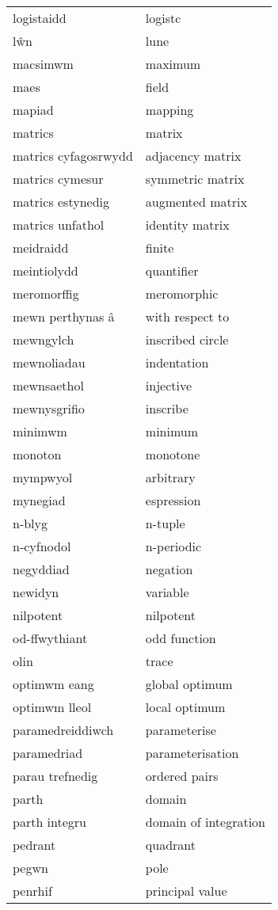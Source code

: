 \begin{supertabular}{p{0.22\textwidth}p{0.22\textwidth}}
logistaidd & logistc \\
lŵn & lune \\
macsimwm & maximum \\
maes & field \\
mapiad & mapping \\
matrics & matrix \\
matrics cyfagosrwydd & adjacency matrix \\
matrics cymesur & symmetric matrix \\
matrics estynedig & augmented matrix \\
matrics unfathol & identity matrix \\
meidraidd & finite \\
meintiolydd & quantifier \\
meromorffig & meromorphic \\
mewn perthynas â & with respect to \\
mewngylch & inscribed circle \\
mewnoliadau & indentation \\
mewnsaethol & injective \\
mewnysgrifio & inscribe \\
minimwm & minimum \\
monoton & monotone \\
mympwyol & arbitrary \\
mynegiad & espression \\
n-blyg & n-tuple \\
n-cyfnodol & n-periodic \\
negyddiad & negation \\
newidyn & variable \\
nilpotent & nilpotent \\
od-ffwythiant & odd function \\
olin & trace \\
optimwm eang & global optimum \\
optimwm lleol & local optimum \\
paramedreiddiwch & parameterise \\
paramedriad & parameterisation \\
parau trefnedig & ordered pairs \\
parth & domain \\
parth integru & domain of integration \\
pedrant & quadrant \\
pegwn & pole \\
penrhif & principal value \\

\end{supertabular}
